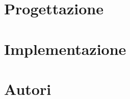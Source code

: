 \documentclass{llncs}
\newcommand{\labelsec}[1]{\label{sec:#1}}
\begin{document}
%
\section{Progettazione}
\labelsec{Project}
%
\section{Implementazione}
\labelsec{Implementation}
%
\labelsec{Testing}
%
\labelsec{Maintenance}
%
\labelsec{Deployment}
%
\newpage
\section{Autori}
\labelsec{Authors}
\end{document}
